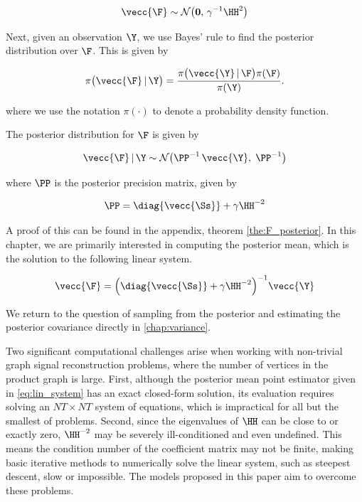 \begin{equation}
    \label{eq:F_prior}
    \vecc{\F} \sim \mathcal{N}\big(\mathbf{0}, \, \gamma^{-1} \HH^2\big)
\end{equation}

Next, given an observation $\Y$, we use Bayes' rule to find the posterior distribution over $\F$. This is given by

\begin{equation}
    \pi\big(\vecc{\F} \, | \, \Y \big) = \frac{\pi\big(\vecc{\Y} \, | \, \F \big) \pi(\F) }{\pi(\Y)}.
\end{equation}

where we use the notation $\pi(\cdot)$ to denote a probability density function.

The posterior distribution for $\F$ is given by

\begin{equation}
    \label{eq:F_post_gsr}
    \vecc{\F} \, | \, \Y \sim \mathcal{N} \big(\PP^{-1} \, \vecc{\Y}, \; \PP^{-1} \big)
\end{equation}

\noindent where $\PP$ is the posterior precision matrix, given by 

\begin{equation}
    \label{eq:P_post_gsr}
    \PP = \diag{\vecc{\Ss}} + \gamma  \HH^{-2}
\end{equation}

A proof of this can be found in the appendix, theorem \ref{the:F_posterior}. In this chapter, we are primarily interested in computing the posterior mean, which is the solution to the following linear system.

\begin{equation}
    \label{eq:lin_system}
    \vecc{\F} = \Big(\diag{\vecc{\Ss}} + \gamma  \HH^{-2}\Big)^{-1} \vecc{\Y}
\end{equation}

We return to the question of sampling from the posterior and estimating the posterior covariance directly in \cref{chap:variance}.

Two significant computational challenges arise when working with non-trivial graph signal reconstruction problems, where the number of vertices in the product graph is large. First, although the posterior mean point estimator given in \cref{eq:lin_system} has an exact closed-form solution, its evaluation requires solving an $NT \times NT$ system of equations, which is impractical for all but the smallest of problems. Second, since the eigenvalues of $\HH$ can be close to or exactly zero, $\HH^{-2}$ may be severely ill-conditioned and even undefined. This means the condition number of the coefficient matrix may not be finite, making basic iterative methods to numerically solve the linear system, such as steepest descent, slow or impossible. The models proposed in this paper aim to overcome these problems.



